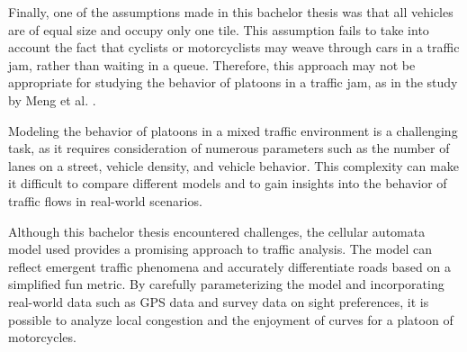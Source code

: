 Finally, one of the assumptions made in this bachelor thesis was that all vehicles are of equal size and occupy only one tile. This assumption fails to take into account the fact that cyclists or motorcyclists may weave through cars in a traffic jam, rather than waiting in a queue. Therefore, this approach may not be appropriate for studying the behavior of platoons in a traffic jam, as in the study by Meng et al. \cite{MENG2007470}.

Modeling the behavior of platoons in a mixed traffic environment is a challenging task, as it requires consideration of numerous parameters such as the number of lanes on a street, vehicle density, and vehicle behavior. This complexity can make it difficult to compare different models and to gain insights into the behavior of traffic flows in real-world scenarios.

Although this bachelor thesis encountered challenges, the cellular automata model used provides a promising approach to traffic analysis. The model can reflect emergent traffic phenomena and accurately differentiate roads based on a simplified fun metric. By carefully parameterizing the model and incorporating real-world data such as GPS data and survey data on sight preferences, it is possible to analyze local congestion and the enjoyment of curves for a platoon of motorcycles. 
